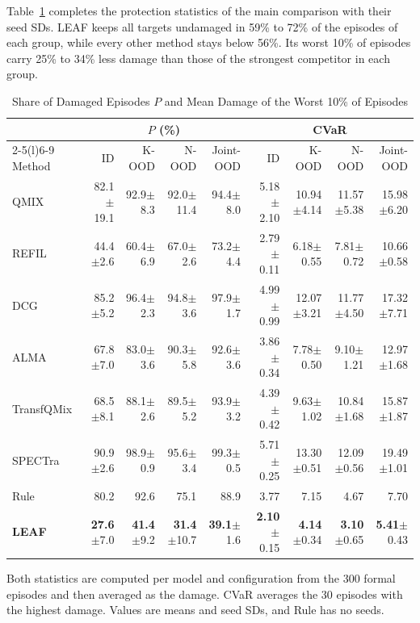 Table~\ref{tab:s-pcvar} completes the protection statistics of the main comparison with their seed SDs. LEAF keeps all targets undamaged in 59\% to 72\% of the episodes of each group, while every other method stays below 56\%. Its worst 10\% of episodes carry 25\% to 34\% less damage than those of the strongest competitor in each group.

\begin{table}[!t]
\centering
\scriptsize
\setlength{\tabcolsep}{3.5pt}
\caption{Share of Damaged Episodes $P$ and Mean Damage of the Worst 10\% of Episodes}
\label{tab:s-pcvar}
\begin{tabular}{@{}lrrrrrrrr@{}}
\toprule
 & \multicolumn{4}{c}{$P$ (\%)} & \multicolumn{4}{c}{CVaR}\\
\cmidrule(lr){2-5}\cmidrule(l){6-9}
Method & ID & K-OOD & N-OOD & Joint-OOD & ID & K-OOD & N-OOD & Joint-OOD\\
\midrule
QMIX & 82.1$\pm$19.1 & 92.9$\pm$8.3 & 92.0$\pm$11.4 & 94.4$\pm$8.0 & 5.18$\pm$2.10 & 10.94$\pm$4.14 & 11.57$\pm$5.38 & 15.98$\pm$6.20\\
REFIL & 44.4$\pm$2.6 & 60.4$\pm$6.9 & 67.0$\pm$2.6 & 73.2$\pm$4.4 & 2.79$\pm$0.11 & 6.18$\pm$0.55 & 7.81$\pm$0.72 & 10.66$\pm$0.58\\
DCG & 85.2$\pm$5.2 & 96.4$\pm$2.3 & 94.8$\pm$3.6 & 97.9$\pm$1.7 & 4.99$\pm$0.99 & 12.07$\pm$3.21 & 11.77$\pm$4.50 & 17.32$\pm$7.71\\
ALMA & 67.8$\pm$7.0 & 83.0$\pm$3.6 & 90.3$\pm$5.8 & 92.6$\pm$3.6 & 3.86$\pm$0.34 & 7.78$\pm$0.50 & 9.10$\pm$1.21 & 12.97$\pm$1.68\\
TransfQMix & 68.5$\pm$8.1 & 88.1$\pm$2.6 & 89.5$\pm$5.2 & 93.9$\pm$3.2 & 4.39$\pm$0.42 & 9.63$\pm$1.02 & 10.84$\pm$1.68 & 15.87$\pm$1.87\\
SPECTra & 90.9$\pm$2.6 & 98.9$\pm$0.9 & 95.6$\pm$3.4 & 99.3$\pm$0.5 & 5.71$\pm$0.25 & 13.30$\pm$0.51 & 12.09$\pm$0.56 & 19.49$\pm$1.01\\
Rule & 80.2 & 92.6 & 75.1 & 88.9 & 3.77 & 7.15 & 4.67 & 7.70\\
\textbf{LEAF} & \textbf{27.6}$\pm$7.0 & \textbf{41.4}$\pm$9.2 & \textbf{31.4}$\pm$10.7 & \textbf{39.1}$\pm$1.6 & \textbf{2.10}$\pm$0.15 & \textbf{4.14}$\pm$0.34 & \textbf{3.10}$\pm$0.65 & \textbf{5.41}$\pm$0.43\\
\bottomrule
\end{tabular}
\par\smallskip
\parbox{\textwidth}{\scriptsize Both statistics are computed per model and configuration from the 300 formal episodes and then averaged as the damage. CVaR averages the 30 episodes with the highest damage. Values are means and seed SDs, and Rule has no seeds.}
\end{table}

